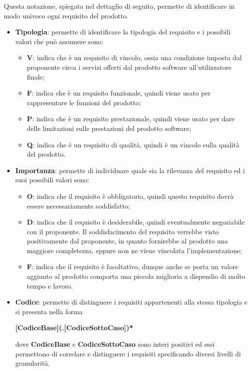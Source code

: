 Questa notazione, spiegata nel dettaglio di seguito, permette di identificare in modo univoco ogni requisito del prodotto.
\begin{itemize}
    \item \textbf{Tipologia}: permette di identificare la tipologia del requisito e i possibili valori che può assumere sono:
    \begin{itemize}
        \item \textbf{V}: indica che è un requisito di vincolo, ossia una condizione imposta dal proponente circa i servizi offerti dal 
        	prodotto software all'utilizzatore finale;
        \item \textbf{F}: indica che è un requisito funzionale, quindi viene usato per rappresentare le funzioni del prodotto;
        \item \textbf{P}: indica che è un requisito prestazionale, quindi viene usato per dare delle limitazioni sulle prestazioni 
        	del prodotto software;
        \item \textbf{Q}: indica che è un requisito di qualità, quindi è un vincolo sulla qualità del prodotto.
    \end{itemize}
    \item \textbf{Importanza}: permette di individuare quale sia la rilevanza del requisito ed i suoi possibili valori sono:
    \begin{itemize}
        \item \textbf{O}: indica che il requisito è obbligatorio, quindi questo requisito dovrà essere necessariamente 
        soddisfatto;
        \item \textbf{D}: indica che il requisito è desiderabile, quindi eventualmente negoziabile con il proponente. 
        Il soddisfacimento del requisito verrebbe visto positivamente dal proponente, in quanto fornirebbe al prodotto 
        una maggiore completezza, eppure non ne viene vincolata l'implementazione;
        \item \textbf{F}: indica che il requisito è facoltativo, dunque anche se porta un valore aggiunto al prodotto
        comporta una piccola miglioria a dispendio di molto tempo e lavoro.
    \end{itemize}
    
    \item \textbf{Codice}: permette di distinguere i requisiti appartenenti alla stessa tipologia e si presenta nella forma
    	\begin{center}
        	\textbf{[CodiceBase](.[CodiceSottoCaso])*}
    	\end{center}
    	dove \textbf{CodiceBase} e \textbf{CodiceSottoCaso} sono interi positivi ed essi permettono di correlare e distinguere i requisiti 
    	specificando diversi livelli di granularità.
\end{itemize}
 
